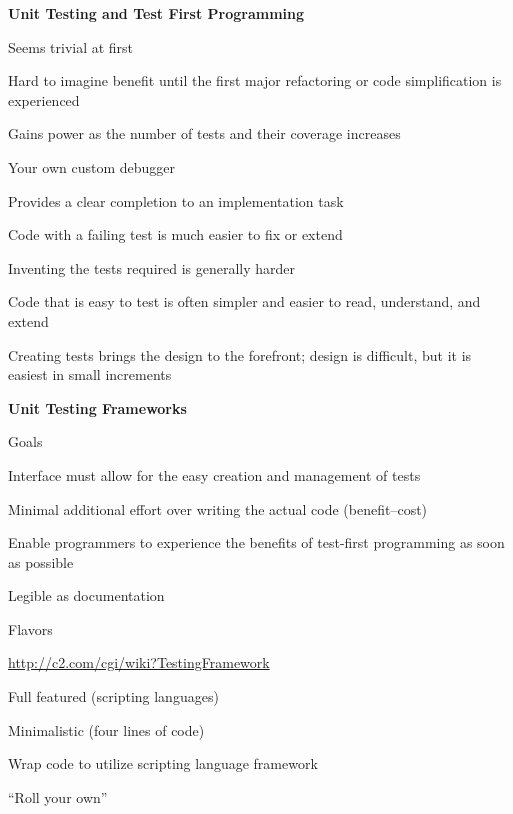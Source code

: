 \documentclass[landscape]{slides}
\renewcommand{\title}[1]{{\large\bfseries #1}}
\newenvironment{itemiz}%
  {\begin{list}{}{\raggedright
      \setlength{\itemsep}{2pt}%
      \setlength{\parskip}{4pt}\setlength{\parsep}{2pt}}}%
  {\end{list}}%
\begin{document}
 \begin{slide}
   \title{ Unit Testing and Test First Programming}
   \begin{itemiz}
   \item Seems trivial at first
   \item Hard to imagine benefit until the first major refactoring or
     code simplification is experienced
   \item Gains power as the number of tests and their coverage increases
   \item Your own custom debugger
   \item Provides a clear completion to an implementation task
   \item Code with a failing test is much easier to fix or extend
   \item Inventing the tests required is generally harder
   \item Code that is easy to test is often simpler and easier to
   read, understand, and extend
   \item Creating tests brings the design to the forefront; design is
   difficult, but it is easiest in small increments
   \end{itemiz}
 \end{slide}

 \begin{slide}
   \title{Unit Testing Frameworks}
   \begin{itemiz}
   \item Goals
     \begin{itemiz}
     \item Interface must allow for the easy creation and management of tests
     \item Minimal additional effort over writing the actual code
     (benefit--cost)
     \item Enable programmers to experience the benefits of test-first
       programming as soon as possible
     \item Legible as documentation
     \end{itemiz}
   \item Flavors
     \begin{itemiz}
     \item \url{http://c2.com/cgi/wiki?TestingFramework}
     \item Full featured (scripting languages)
     \item Minimalistic (four lines of code)
     \item Wrap code to utilize scripting language framework
     \item ``Roll your own''
     \end{itemiz}
   \end{itemiz}
 \end{slide}
 
\end{document}
